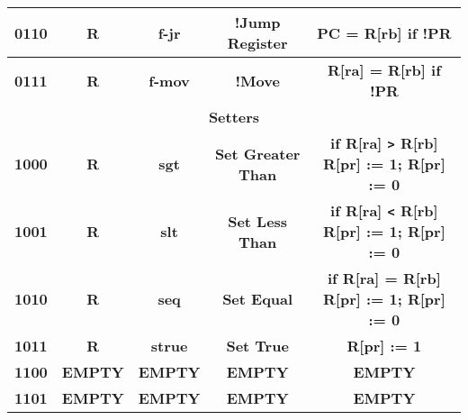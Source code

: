 \documentclass{article}
\begin{document}
\begin{table}[H]
\begin{tabular}{|c|*{4}{c|}}
        \multicolumn{1}{|c|}{\textbf{0110}}   & \multicolumn{1}{c|}{\textbf{R}}     & \multicolumn{1}{c|}{\textbf{f-jr}}      & \multicolumn{1}{c|}{\textbf{!Jump Register}}            & \multicolumn{1}{c|}{\textbf{PC = R[rb] if !PR}}                                \\ \hline
        \multicolumn{1}{|c|}{\textbf{0111}}   & \multicolumn{1}{c|}{\textbf{R}}     & \multicolumn{1}{c|}{\textbf{f-mov}}     & \multicolumn{1}{c|}{\textbf{!Move}}                     & \multicolumn{1}{c|}{\textbf{R[ra] = R[rb] if !PR}}                             \\ \hline
        \multicolumn{5}{|c|}{\textbf{Setters}}                                                                                                                                                                                                                           \\ \hline 
        \multicolumn{1}{|c|}{\textbf{1000}}   & \multicolumn{1}{c|}{\textbf{R}}     & \multicolumn{1}{c|}{\textbf{sgt}}       & \multicolumn{1}{c|}{\textbf{Set Greater Than}}          & \multicolumn{1}{c|}{\textbf{if R[ra] \texttt{>} R[rb] R[pr] := 1; R[pr] := 0}} \\ \hline
        \multicolumn{1}{|c|}{\textbf{1001}}   & \multicolumn{1}{c|}{\textbf{R}}     & \multicolumn{1}{c|}{\textbf{slt}}       & \multicolumn{1}{c|}{\textbf{Set Less Than}}             & \multicolumn{1}{c|}{\textbf{if R[ra] \texttt{<} R[rb] R[pr] := 1; R[pr] := 0}} \\ \hline
        \multicolumn{1}{|c|}{\textbf{1010}}   & \multicolumn{1}{c|}{\textbf{R}}     & \multicolumn{1}{c|}{\textbf{seq}}       & \multicolumn{1}{c|}{\textbf{Set Equal}}                 & \multicolumn{1}{c|}{\textbf{if R[ra] = R[rb] R[pr] := 1; R[pr] := 0}}          \\ \hline
        \multicolumn{1}{|c|}{\textbf{1011}}   & \multicolumn{1}{c|}{\textbf{R}}     & \multicolumn{1}{c|}{\textbf{strue}}     & \multicolumn{1}{c|}{\textbf{Set True}}                  & \multicolumn{1}{c|}{\textbf{R[pr] := 1}}                                       \\ \hline
        \multicolumn{1}{|c|}{\textbf{1100}}   & \multicolumn{1}{c|}{\textbf{EMPTY}} & \multicolumn{1}{c|}{\textbf{EMPTY}}     & \multicolumn{1}{c|}{\textbf{EMPTY}}                     & \multicolumn{1}{c|}{\textbf{EMPTY}}                                            \\ \hline
        \multicolumn{1}{|c|}{\textbf{1101}}   & \multicolumn{1}{c|}{\textbf{EMPTY}} & \multicolumn{1}{c|}{\textbf{EMPTY}}     & \multicolumn{1}{c|}{\textbf{EMPTY}}                     & \multicolumn{1}{c|}{\textbf{EMPTY}}                                            \\ \hline

\end{tabular}
\end{table}
\end{document}
